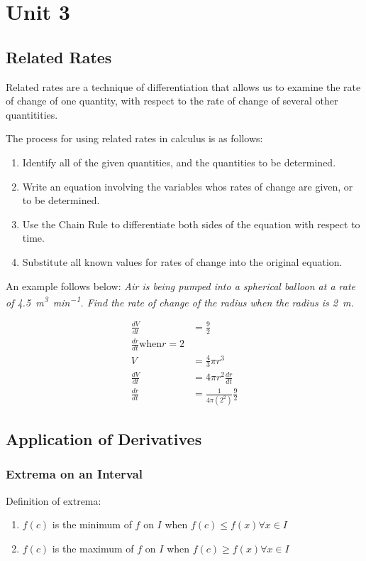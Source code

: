 \chapter{Unit 3}
\section{Related Rates}
Related rates are a technique of differentiation that allows us to examine the
rate of change of one quantity, with respect to the rate of change of several
other quantitities.

The process for using related rates in calculus is as follows:
\begin{enumerate}
  \item Identify all of the given quantities, and the quantities to be
    determined.
  \item Write an equation involving the variables whos rates of change are
    given, or to be determined.
  \item Use the Chain Rule to differentiate both sides of the equation with
    respect to time.
  \item Substitute all known values for rates of change into the original
    equation.
\end{enumerate}

An example follows below:
\textit{Air is being pumped into a spherical balloon at a rate of
\SI{4.5}{\meter\cubed\per\minute}. Find the rate of change of the radius when the
radius is \SI{2}{\meter}.}

\begin{align*}
  \frac{dV}{dt} &= \frac{9}{2} \\
  \frac{dr}{dt} \text{when} r=2 \\
  V &= \frac{4}{3}\pi{r^3} \\
  \frac{dV}{dt} &= 4\pi{r^2}\frac{dr}{dt} \\
  \frac{dr}{dt} &= \frac{1}{4\pi(2^2)}\frac{9}{2}
\end{align*}

\section{Application of Derivatives}
\subsection{Extrema on an Interval}
Definition of extrema:
\begin{enumerate}
  \item $f(c)$ is the minimum of $f$ on $I$ when $f(c) \leq f(x) \forall x \in
    I$
  \item $f(c)$ is the maximum of $f$ on $I$ when $f(c) \geq f(x) \forall x \in
    I$
\end{enumerate}


